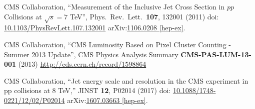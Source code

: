 \begin{thebibliography}{99}
CMS Collaboration, ``Measurement of the Inclusive Jet Cross Section in $pp$ Collisions at $\sqrt{s}=7$ TeV'', Phys.\ Rev.\ Lett.\ {\bf 107}, 132001 (2011) doi: \href{https://doi.org/10.1103/PhysRevLett.107.132001}{10.1103/PhysRevLett.107.132001} arXiv:\href{https://arxiv.org/abs/1106.0208}{1106.0208 [hep-ex]}.

CMS Collaboration, ``CMS Luminosity Based on Pixel Cluster Counting - Summer 2013 Update'', CMS Physics Analysis Summary {\bf CMS-PAS-LUM-13-001} (2013) \url{http://cds.cern.ch/record/1598864}
  
CMS Collaboration, ``Jet energy scale and resolution in the CMS experiment in pp collisions at 8 TeV,'' JINST {\bf 12}, P02014 (2017) doi: \href{http://dx.doi.org/10.1088/1748-0221/12/02/P02014}{10.1088/1748-0221/12/02/P02014} arXiv:\href{https://arxiv.org/abs/1607.03663}{1607.03663 [hep-ex]}.
  

\end{thebibliography}
